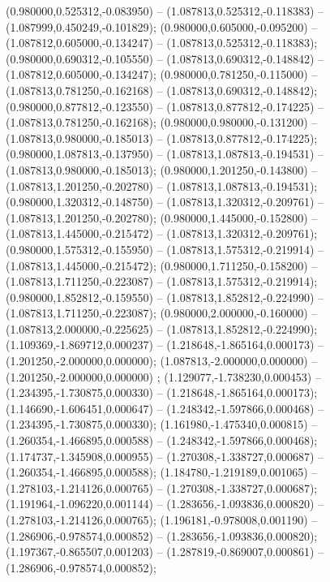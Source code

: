  (0.980000,0.525312,-0.083950) -- (1.087813,0.525312,-0.118383) -- (1.087999,0.450249,-0.101829);
 (0.980000,0.605000,-0.095200) -- (1.087812,0.605000,-0.134247) -- (1.087813,0.525312,-0.118383);
 (0.980000,0.690312,-0.105550) -- (1.087813,0.690312,-0.148842) -- (1.087812,0.605000,-0.134247);
 (0.980000,0.781250,-0.115000) -- (1.087813,0.781250,-0.162168) -- (1.087813,0.690312,-0.148842);
 (0.980000,0.877812,-0.123550) -- (1.087813,0.877812,-0.174225) -- (1.087813,0.781250,-0.162168);
 (0.980000,0.980000,-0.131200) -- (1.087813,0.980000,-0.185013) -- (1.087813,0.877812,-0.174225);
 (0.980000,1.087813,-0.137950) -- (1.087813,1.087813,-0.194531) -- (1.087813,0.980000,-0.185013);
 (0.980000,1.201250,-0.143800) -- (1.087813,1.201250,-0.202780) -- (1.087813,1.087813,-0.194531);
 (0.980000,1.320312,-0.148750) -- (1.087813,1.320312,-0.209761) -- (1.087813,1.201250,-0.202780);
 (0.980000,1.445000,-0.152800) -- (1.087813,1.445000,-0.215472) -- (1.087813,1.320312,-0.209761);
 (0.980000,1.575312,-0.155950) -- (1.087813,1.575312,-0.219914) -- (1.087813,1.445000,-0.215472);
 (0.980000,1.711250,-0.158200) -- (1.087813,1.711250,-0.223087) -- (1.087813,1.575312,-0.219914);
 (0.980000,1.852812,-0.159550) -- (1.087813,1.852812,-0.224990) -- (1.087813,1.711250,-0.223087);
 (0.980000,2.000000,-0.160000) -- (1.087813,2.000000,-0.225625) -- (1.087813,1.852812,-0.224990);
 (1.109369,-1.869712,0.000237) -- (1.218648,-1.865164,0.000173) -- (1.201250,-2.000000,0.000000);
 (1.087813,-2.000000,0.000000) -- (1.201250,-2.000000,0.000000) ;
 (1.129077,-1.738230,0.000453) -- (1.234395,-1.730875,0.000330) -- (1.218648,-1.865164,0.000173);
 (1.146690,-1.606451,0.000647) -- (1.248342,-1.597866,0.000468) -- (1.234395,-1.730875,0.000330);
 (1.161980,-1.475340,0.000815) -- (1.260354,-1.466895,0.000588) -- (1.248342,-1.597866,0.000468);
 (1.174737,-1.345908,0.000955) -- (1.270308,-1.338727,0.000687) -- (1.260354,-1.466895,0.000588);
 (1.184780,-1.219189,0.001065) -- (1.278103,-1.214126,0.000765) -- (1.270308,-1.338727,0.000687);
 (1.191964,-1.096220,0.001144) -- (1.283656,-1.093836,0.000820) -- (1.278103,-1.214126,0.000765);
 (1.196181,-0.978008,0.001190) -- (1.286906,-0.978574,0.000852) -- (1.283656,-1.093836,0.000820);
 (1.197367,-0.865507,0.001203) -- (1.287819,-0.869007,0.000861) -- (1.286906,-0.978574,0.000852);
